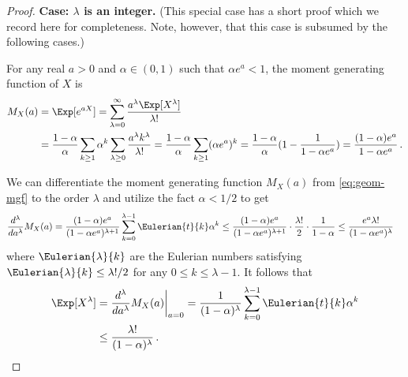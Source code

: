 \begin{proof}
    \noindent
    \textbf{Case: $\lambda$ is an integer.} (This special case has a short proof which we record here for completeness. 
    Note, however, that this case is subsumed by the following cases.)

    For any real $a > 0$ and $\alpha \in (0, 1)$ such that $\alpha e^a < 1$, 
    the moment generating function of $X$ is 
    \begin{align}\label{eq:geom-mgf}
    M_X(a)
    &= \Exp[e^{a X}] 
    = \sum_{\lambda=0}^\infty{\frac{a^\lambda \Exp[X^\lambda]}{\lambda!}} \nonumber \\
    &= \frac{1-\alpha}{\alpha} \sum_{k \geq 1} \alpha^k \sum_{\lambda \geq 0} \frac{a^\lambda k^\lambda }{\lambda!}
    = \frac{1-\alpha}{\alpha}  \sum_{k \geq 1} (\alpha e^a)^k
    = \frac{1-\alpha}{\alpha} (1 - \frac{1}{1-\alpha e^a})
    = \frac{(1-\alpha) e^a}{1-\alpha e^a}
    \, .
    \end{align}

    We can differentiate the moment generating function $M_X(a)$ from \eqref{eq:geom-mgf} to the order $\lambda$ 
    and utilize the fact $\alpha < 1/2$ to get
    \begin{align*}
        \frac{d^\lambda}{d a^\lambda}M_X(a)
        &= \frac{(1-\alpha)e^a}{(1-\alpha e^a)^{\lambda+1}} \sum_{k=0}^{\lambda-1}{\Eulerian{t}{k}
        \alpha^k}
        \leq \frac{(1-\alpha)e^a}{(1-\alpha e^a)^{\lambda+1}} \cdot \frac{\lambda!}{2} \cdot \frac{1}{1-\alpha}
        \leq \frac{e^a \lambda!}{(1-\alpha e^a)^{\lambda}} 
    \end{align*}
    where $\Eulerian{\lambda}{k}$ are the Eulerian numbers satisfying $\Eulerian{\lambda}{k} \leq \lambda!/2$ for any $0 \leq k \leq \lambda-1$. 
    It follows that
    \begin{align}
        \Exp[X^\lambda]
        &=\frac{d^\lambda}{d a^\lambda}M_X(a)\bigg\vert_{a=0}
        = \frac{1}{(1-\alpha )^{\lambda}} \sum_{k=0}^{\lambda-1}{\Eulerian{t}{k}\alpha^k} \label{eq:geom-moment-int-exact}\\
        &\leq \frac{\lambda!}{(1-\alpha)^{\lambda}} \label{eq:mgf-geom-derivative}
        \,.
    \end{align}


\end{proof}
